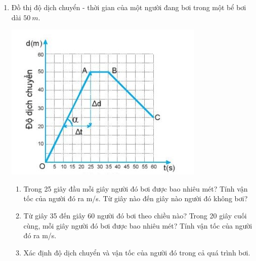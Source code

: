\begin{enumerate}[label=\bfseries Bài \arabic*:,leftmargin=1.5cm]
{	}
	

	\item {}
	
	{
		Đồ thị độ dịch chuyển - thời gian của một người đang bơi trong một bể bơi dài $\SI{50}{m}$. 
		\begin{center}
			\includegraphics[scale=1]{../figs/VN10-2022-PH-TP006-2.jpg}
		\end{center}
	\begin{enumerate}[label=\alph*)]
		\item Trong 25 giây đầu mỗi giây người đó bơi được bao nhiêu mét? Tính vận tốc của người đó ra m/s. Từ giây nào đến giây nào người đó không bơi?
		\item Từ giây 35 đến giây 60 người đó bơi theo chiều nào? Trong 20 giây cuối cùng, mỗi giây người đó bơi được bao nhiêu mét? Tính vận tốc của người đó ra m/s.
		\item Xác định độ dịch chuyển và vận tốc của người đó trong cả quá trình bơi.
	\end{enumerate}
}
\end{enumerate}
